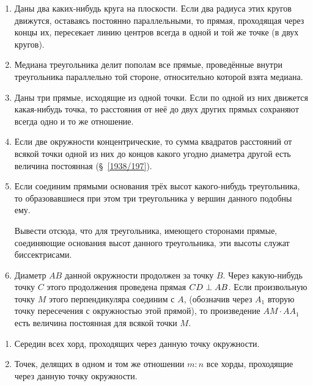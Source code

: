{\begin{enumerate}[noitemsep]
\item
Даны два каких-нибудь круга на плоскости.
Если два радиуса этих кругов движутся, оставаясь постоянно параллельными, то прямая, проходящая через концы их, пересекает линию центров всегда в одной и той же точке (в  двух кругов).

\item
Медиана треугольника делит пополам все прямые, проведённые внутри треугольника параллельно той стороне, относительно которой взята медиана.

\item
Даны три прямые, исходящие из одной точки.
Если по одной из них движется какая-нибудь точка, то расстояния от неё до двух других прямых сохраняют всегда одно и то же отношение.

\item
Если две окружности концентрические, то сумма квадратов расстояний от всякой точки одной из них до концов какого угодно диаметра другой есть величина постоянная (§~\ref{1938/197}).

\item
Если соединим прямыми основания трёх высот какого-нибудь треугольника, то образовавшиеся при этом три треугольника у вершин данного подобны ему.

Вывести отсюда, что для треугольника, имеющего сторонами прямые, соединяющие основания высот данного треугольника, эти высоты служат биссектрисами.

\item
Диаметр $AB$ данной окружности продолжен за точку $B$.
Через какую-нибудь точку $C$ этого продолжения проведена прямая $CD\z\perp AB$.
Если произвольную точку $M$ этого перпендикуляра соединим с $A$, (обозначив через $A_1$ вторую точку пересечения с окружностью этой прямой), то произведение $AM\cdot  AA_1$ есть величина постоянная для всякой точки $M$.

\end{enumerate}

\begin{center}
\end{center}

\begin{enumerate}

\item
Середин всех хорд, проходящих через данную точку окружности.

\item
Точек, делящих в одном и том же отношении $m:n$ все хорды, проходящие через данную точку окружности.


\end{enumerate}}
